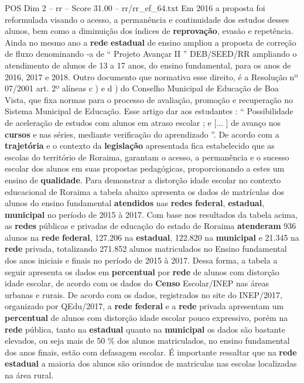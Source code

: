 \begin{textsample}{POS Dim 2 – rr – Score 31.00 – rr/rr\_ef\_64.txt}
Em 2016 a proposta foi reformulada visando o acesso, a permanência e continuidade dos estudos desses alunos, bem como a diminuição dos índices de \textbf{reprovação}, evasão e repetência.
Ainda no mesmo ano a \textbf{rede} \textbf{estadual} de ensino ampliou a proposta de correção de fluxo denominando -a de “ Projeto Avançar II ” DEB/SEED/RR ampliando o atendimento de alunos de 13 a 17 anos, do ensino fundamental, para os anos de 2016, 2017 e 2018.
Outro documento que normativa esse direito, é a Resolução nº 07/2001 art. 2º alíneas c ) e d ) do Conselho Municipal de Educação de Boa Vista, que fixa normas para o processo de avaliação, promoção e recuperação no Sistema Municipal de Educação.
Esse artigo dar aos estudantes : “ Possibilidade de aceleração de estudos com alunos em atraso escolar ; e [... ] de avanço nos \textbf{cursos} e nas séries, mediante verificação do aprendizado ”.
De acordo com a \textbf{trajetória} e o contexto da \textbf{legislação} apresentada fica estabelecido que as escolas do território de Roraima, garantam o acesso, a permanência e o sucesso escolar dos alunos em suas propostas pedagógicas, proporcionando a estes um ensino de \textbf{qualidade}.
Para demonstrar a distorção idade escolar no contexto educacional de Roraima a tabela abaixo apresenta os dados de matrículas dos alunos do ensino fundamental \textbf{atendidos} nas \textbf{redes} \textbf{federal}, \textbf{estadual}, \textbf{municipal} no período de 2015 à 2017.
Com base nos resultados da tabela acima, as \textbf{redes} públicas e privadas de educação do estado de Roraima \textbf{atenderam} 936 alunos na \textbf{rede} \textbf{federal}, 127.206 na \textbf{estadual}, 122.820 na \textbf{municipal} e 21.345 na \textbf{rede} privada, totalizando 271.852 alunos matriculados no Ensino fundamental dos anos iniciais e finais no período de 2015 à 2017.
Dessa forma, a tabela a seguir apresenta os dados em \textbf{percentual} por \textbf{rede} de alunos com distorção idade escolar, de acordo com os dados do \textbf{Censo} Escolar/INEP nas áreas urbanas e rurais.
De acordo com os dados, registrados no site do INEP/2017, organizado por QEdu/2017, a \textbf{rede} \textbf{federal} e a \textbf{rede} privada apresentam um \textbf{percentual} de alunos com distorção idade escolar pouco expressivo, porém na \textbf{rede} pública, tanto na \textbf{estadual} quanto na \textbf{municipal} os dados são bastante elevados, ou seja mais de 50 \% dos alunos matriculados, no ensino fundamental dos anos finais, estão com defasagem escolar.
É importante ressaltar que na \textbf{rede} \textbf{estadual} a maioria dos alunos são oriundos de matriculas nas escolas localizadas na área rural.

\end{textsample}
